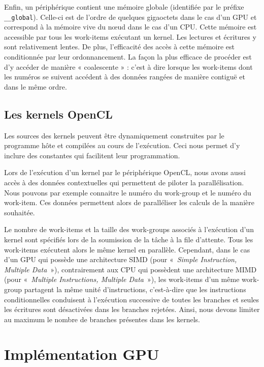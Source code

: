 Enfin, un périphérique contient une mémoire globale (identifiée par le préfixe \verb|__global|). Celle-ci est de l’ordre de quelques gigaoctets dans le cas
d’un GPU et correspond à la mémoire vive du nœud dans le cas d'un CPU.
Cette mémoire est accessible par tous les work-items exécutant un kernel.
Les lectures et écritures y sont relativement lentes. De plus, l’efficacité des
accès à cette mémoire est conditionnée par leur ordonnancement. La façon la plus
efficace de procéder est d’y accéder de manière « coalescente » : c'est à dire
lorsque les work-items dont les numéros se suivent accédent à des données rangées
de manière contiguë et dans le même ordre.
\\

\subsection{Les kernels OpenCL}
\label{ssect:kernels_opencl}

Les sources des kernels peuvent être dynamiquement construites par le programme hôte
et compilées au cours de l’exécution.
Ceci nous permet d’y inclure des constantes qui facilitent leur programmation.

Lors de l’exécution d’un kernel par le périphérique OpenCL, nous avons aussi
accès à des données contextuelles qui permettent de piloter la parallélisation.
Nous pouvons par exemple connaitre le numéro du work-group et le numéro du
work-item. Ces données permettent alors de paralléliser les calculs de la
manière souhaitée.

Le nombre de work-items et la taille des work-groups associés à l’exécution d’un
kernel sont spécifiés lors de la soumission de la tâche à la file d’attente.
Tous les work-items exécutent alors le même kernel en parallèle. Cependant,
dans le cas d'un GPU qui possède une architecture SIMD (pour
«~\textit{Simple Instruction, Multiple Data}~»), contrairement aux CPU
qui possèdent une architecture MIMD (pour «~\textit{Multiple Instructions, Multiple Data}~»),
les work-items d’un même work-group partagent la même unité d’instructions,
c'est-à-dire que les instructions conditionnelles conduisent
à l’exécution successive de toutes les branches et seules les écritures sont
désactivées dans les branches rejetées. Ainsi, nous devons limiter au maximum
le nombre de branches présentes dans les kernels.
\\



\section{Implémentation GPU}
\label{sect:implementation_gpu}

